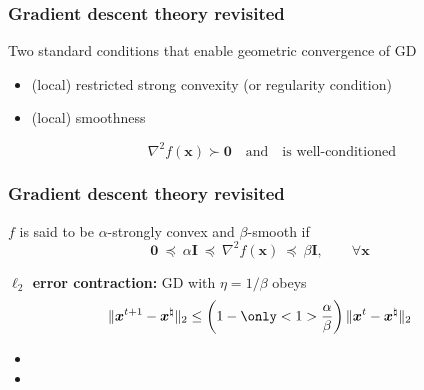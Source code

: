 \documentclass[compress,
mathserif,wide,%
]{beamer}
\newcommand{\ProbFigs}{figure}
\begin{document}
\begin{frame}
\frametitle{Gradient descent theory revisited}



	\begin{figure}
	
	\end{figure}



Two standard conditions that enable geometric convergence of GD
\smallskip

	\begin{itemize}
		\itemsep0.3em
		\item<2-> (local) restricted strong convexity (or regularity condition) 

		\item<3-> (local) smoothness

		\vspace{-0.5em}
		\[
			\nabla^2 f( \bm{x} ) \succ \bm{0} \quad \text{and} \quad \text{is well-conditioned} 
		\]
	\end{itemize}


\end{frame}





\begin{frame}
	\frametitle{Gradient descent theory revisited}


	$f$ is said to be $\alpha$-strongly convex and $\beta$-smooth if 
	\[
		\bm{0} ~\preceq~ \alpha \bm{I} ~\preceq~ \nabla^2 f(\bm{x})  ~\preceq~ \beta \bm{I}, \qquad \forall \bm{x}
	\]

\vfill
{

\begin{varblock}[\textwidth]{}
  	{\bf $\ell_2$ error contraction:} GD with $\eta = 1/\beta$ obeys
	\vspace{-0.3em}
	\[
		\|\bm{x}^{t+1} -\bm{x}^\natural\|_2 \leq \left(1- \only<1>{\frac{\alpha}{\beta}} 
\right)\|\bm{x}^{t} -\bm{x}^\natural\|_2
	\]
\end{varblock}
}


\begin{itemize}
	\itemsep0.5em
	\item[] \quad
	\item[] \quad
\end{itemize}

\end{frame}
\end{document}
